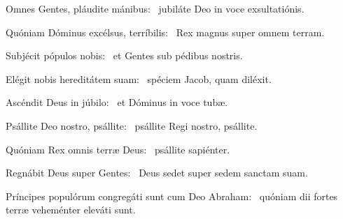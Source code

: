 \item Omnes Gentes, pláudite mánibus:~\psstar{} jubiláte Deo in voce exsultatiónis.

\item Quóniam Dóminus excélsus, terríbilis:~\psstar{} Rex magnus super omnem terram.

\item Subjécit pópulos nobis:~\psstar{} et Gentes sub pédibus nostris.

\item Elégit nobis hereditátem suam:~\psstar{} spéciem Jacob, quam diléxit.

\item Ascéndit Deus in júbilo:~\psstar{} et Dóminus in voce tubæ.

\item Psállite Deo nostro, psállite:~\psstar{} psállite Regi nostro, psállite.

\item Quóniam Rex omnis terræ Deus:~\psstar{} psállite sapiénter.

\item Regnábit Deus super Gentes:~\psstar{} Deus sedet super sedem sanctam suam.

\item Príncipes populórum congregáti sunt cum Deo Abraham:~\psstar{} quóniam dii fortes terræ veheménter eleváti sunt.
